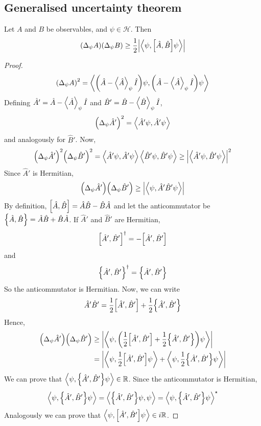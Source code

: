 \subsection{Generalised uncertainty theorem}
\begin{theorem}
	Let \( A \) and \( B \) be observables, and \( \psi \in \mathcal H \).
	Then
	\[
		\qty(\Delta_\psi A)\qty(\Delta_\psi B) \geq \frac{1}{2} \abs{\left\langle{\psi, \qty[\hat A, \hat B]\psi}\right\rangle}
	\]
\end{theorem}
\begin{proof}
	\[
		\qty(\Delta_\psi A)^2 = \left\langle{\qty(\hat A - \left\langle{\hat A}\right\rangle_\psi \hat I) \psi, \qty(\hat A - \left\langle{\hat A}\right\rangle_\psi \hat I) \psi}\right\rangle
	\]
	Defining \( \hat A' = \hat A - \left\langle{\hat A}\right\rangle_\psi \hat I \) and \( \hat B' = \hat B - \left\langle{\hat B}\right\rangle_\psi \hat I \),
	\[
		\qty(\Delta_\psi \hat A')^2 = \left\langle{\hat A' \psi, \hat A' \psi}\right\rangle
	\]
	and analogously for \( \hat B' \).
	Now,
	\[
		\qty(\Delta_\psi \hat A')^2 \qty(\Delta_\psi \hat B')^2 = \left\langle{\hat A' \psi, \hat A' \psi}\right\rangle \left\langle{\hat B' \psi, \hat B' \psi}\right\rangle \geq \abs{\left\langle{\hat A' \psi, \hat B' \psi}\right\rangle}^2
	\]
	Since \( \hat A' \) is Hermitian,
	\[
		\qty(\Delta_\psi \hat A') \qty(\Delta_\psi \hat B') \geq \abs{\left\langle{\psi, \hat A' \hat B' \psi}\right\rangle}
	\]
	By definition, \( \qty[\hat A, \hat B] = \hat A \hat B - \hat B \hat A \) and let the anticommutator be \( \qty{\hat A, \hat B} = \hat A \hat B + \hat B \hat A \).
	If \( \hat A' \) and \( \hat B' \) are Hermitian,
	\[
		\qty[\hat A', \hat B']^\dagger = - \qty[\hat A', \hat B']
	\]
	and
	\[
		\qty{\hat A', \hat B'}^\dagger = \qty{\hat A', \hat B'}
	\]
	So the anticommutator is Hermitian.
	Now, we can write
	\[
		\hat A' \hat B' = \frac{1}{2} \qty[\hat A', \hat B'] + \frac{1}{2} \qty{\hat A', \hat B'}
	\]
	Hence,
	\begin{align*}
		\qty(\Delta_\psi \hat A') \qty(\Delta_\psi \hat B') & \geq \abs{\left\langle{\psi, \qty(\frac{1}{2} \qty[\hat A', \hat B'] + \frac{1}{2} \qty{\hat A', \hat B'}) \psi}\right\rangle}           \\
		                                                    & = \abs{\left\langle{\psi, \frac{1}{2} \qty[\hat A', \hat B'] \psi}\right\rangle + \left\langle{\psi, \frac{1}{2} \qty{\hat A', \hat B'} \psi}\right\rangle}
	\end{align*}
	We can prove that \( \left\langle{\psi, \qty{\hat A', \hat B'} \psi}\right\rangle \in \mathbb R \).
	Since the anticommutator is Hermitian,
	\[
		\left\langle{\psi, \qty{\hat A', \hat B'} \psi}\right\rangle = \left\langle{\qty{\hat A', \hat B'} \psi, \psi}\right\rangle = \left\langle{\psi, \qty{\hat A', \hat B'} \psi}\right\rangle^\star
	\]
	Analogously we can prove that \( \left\langle{\psi, \qty[\hat A', \hat B'] \psi}\right\rangle \in i\mathbb R \).

\end{proof}
